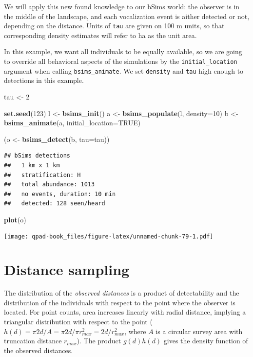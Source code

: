 \documentclass[12pt,]{book}
\newenvironment{Shaded}{\begin{snugshade}}{\end{snugshade}}
\newcommand{\DataTypeTok}[1]{\textcolor[rgb]{0.13,0.29,0.53}{#1}}
\newcommand{\DecValTok}[1]{\textcolor[rgb]{0.00,0.00,0.81}{#1}}
\newcommand{\KeywordTok}[1]{\textcolor[rgb]{0.13,0.29,0.53}{\textbf{#1}}}
\newcommand{\NormalTok}[1]{#1}
\newcommand{\OtherTok}[1]{\textcolor[rgb]{0.56,0.35,0.01}{#1}}
\newcommand{\StringTok}[1]{\textcolor[rgb]{0.31,0.60,0.02}{#1}}
\begin{document}
We will apply this new found knowledge to our bSims world:
the observer is in the middle of the landscape, and each vocalization
event is aither detected or not, depending on the distance.
Units of \texttt{tau} are given on 100 m units, so that corresponding
density estimates will refer to ha as the unit area.

In this example, we want all individuals to be equally available,
so we are going to override all behavioral aspects of the simulations
by the \texttt{initial\_location} argument when calling \texttt{bsims\_animate}.
We set \texttt{density} and \texttt{tau} high enough to detections in this example.

\begin{Shaded}
\begin{Highlighting}[]
\NormalTok{tau <-}\StringTok{ }\DecValTok{2}

\KeywordTok{set.seed}\NormalTok{(}\DecValTok{123}\NormalTok{)}
\NormalTok{l <-}\StringTok{ }\KeywordTok{bsims_init}\NormalTok{()}
\NormalTok{a <-}\StringTok{ }\KeywordTok{bsims_populate}\NormalTok{(l, }\DataTypeTok{density=}\DecValTok{10}\NormalTok{)}
\NormalTok{b <-}\StringTok{ }\KeywordTok{bsims_animate}\NormalTok{(a, }\DataTypeTok{initial_location=}\OtherTok{TRUE}\NormalTok{)}

\NormalTok{(o <-}\StringTok{ }\KeywordTok{bsims_detect}\NormalTok{(b, }\DataTypeTok{tau=}\NormalTok{tau))}
\end{Highlighting}
\end{Shaded}

\begin{verbatim}
## bSims detections
##   1 km x 1 km
##   stratification: H
##   total abundance: 1013
##   no events, duration: 10 min
##   detected: 128 seen/heard
\end{verbatim}

\begin{Shaded}
\begin{Highlighting}[]
\KeywordTok{plot}\NormalTok{(o)}
\end{Highlighting}
\end{Shaded}

\texttt{[image: qpad-book\_files/figure-latex/unnamed-chunk-79-1.pdf]}

\hypertarget{distance-sampling}{%
\section{Distance sampling}\label{distance-sampling}}

The distribution of the \emph{observed distances} is a product of detectability
and the distribution of the individuals with respect to the point where
the observer is located.
For point counts, area increases linearly with radial distance,
implying a triangular distribution with respect to the point
(\(h(d)=\pi 2 d /A=\pi 2 d / \pi r_{max}^2=2 d / r_{max}^2\), where
\(A\) is a circular survey area with truncation distance \(r_{max}\)).
The product \(g(d) h(d)\) gives the density function of the observed distances.
\end{document}
